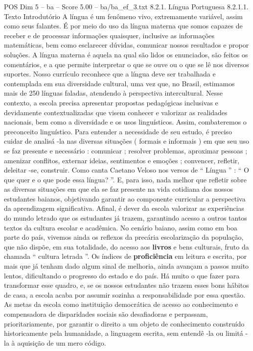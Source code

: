 \begin{textsample}{POS Dim 5 – ba – Score 5.00 – ba/ba\_ef\_3.txt}  \label{ex:f5_pos_276}
8.2.1.
Língua Portuguesa 8.2.1.1.
Texto Introdutório A língua é um fenômeno vivo, extremamente variável, assim como seus falantes.
É por meio do uso da língua materna que somos capazes de receber e de processar informações quaisquer, inclusive as informações matemáticas, bem como esclarecer dúvidas, comunicar nossos resultados e propor soluções.
A língua materna é aquela na qual são lidos os enunciados, são feitos os comentários, e a que permite interpretar o que se ouve ou o que se lê nos diversos suportes.
Nosso currículo reconhece que a língua deve ser trabalhada e contemplada em sua diversidade cultural, uma vez que, no Brasil, estimamos mais de 250 línguas faladas, atendendo à perspectiva intercultural.
Nesse contexto, a escola precisa apresentar propostas pedagógicas inclusivas e devidamente contextualizadas que visem conhecer e valorizar as realidades nacionais, bem como a diversidade e os usos linguísticos.
Assim, combateremos o preconceito linguístico.
Para entender a necessidade de seu estudo, é preciso cuidar de analisá -la nas diversas situações ( formais e informais ) em que seu uso se faz presente e necessário : comunicar ; resolver problemas, aproximar pessoas ; amenizar conflitos, externar ideias, sentimentos e emoções ; convencer, refletir, deleitar -se, construir.
Como canta Caetano Veloso nos versos de “ Língua ” : “ O que quer e o que pode essa língua? ”.
E, para isso, nada melhor que refletir sobre as diversas situações em que ela se faz presente na vida cotidiana dos nossos estudantes baianos, objetivando garantir ao componente curricular a perspectiva da aprendizagem significativa.
Afinal, é dever da escola valorizar as experiências do mundo letrado que os estudantes já trazem, garantindo acesso a outros tantos textos da cultura escolar e acadêmica.
No cenário baiano, assim como em boa parte do país, vivemos ainda os reflexos da precária escolarização da população, que não dispõe, em sua totalidade, do acesso aos \textbf{livros} e bens culturais, fruto da chamada “ cultura letrada ”.
Os índices de \textbf{proficiência} em leitura e escrita, por mais que já tenham dado algum sinal de melhoria, ainda avançam a passos muito lentos, dificultando o progresso do estado e do país.
Há muito o que fazer para transformar esse quadro, e, se os nossos estudantes não trazem esses bons hábitos de casa, a escola acaba por assumir sozinha a responsabilidade por essa questão.
As metas da escola como instituição democrática de acesso ao conhecimento e compensadora de disparidades sociais são desafiadoras e perpassam, prioritariamente, por garantir o direito a um objeto de conhecimento construído historicamente pela humanidade, a linguagem escrita, sem entendê -la ou limitá -la à aquisição de um mero código.

\end{textsample}
